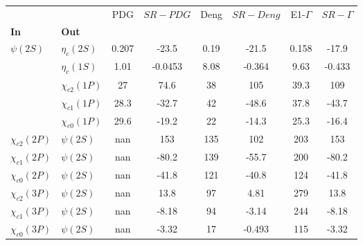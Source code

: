 \begin{tabular}{l|l|c|c|c|c|c|c}
\toprule
                &            &   PDG & $SR-PDG$ &  Deng & $SR-Deng$ &  E1-$\Gamma$ & $SR-\Gamma$ \\
\textbf{In} & \textbf{Out} &       &          &       &           &              &             \\
\midrule
\textbf{$\psi(2S)$} & \textbf{$\eta_{c}(2S)$} & 0.207 &    -23.5 &  0.19 &     -21.5 &        0.158 &       -17.9 \\
                & \textbf{$\eta_{c}(1S)$} &  1.01 &  -0.0453 &  8.08 &    -0.364 &         9.63 &      -0.433 \\
                & \textbf{$\chi_{c2}(1P)$} &    27 &     74.6 &    38 &       105 &         39.3 &         109 \\
                & \textbf{$\chi_{c1}(1P)$} &  28.3 &    -32.7 &    42 &     -48.6 &         37.8 &       -43.7 \\
                & \textbf{$\chi_{c0}(1P)$} &  29.6 &    -19.2 &    22 &     -14.3 &         25.3 &       -16.4 \\
\textbf{$\chi_{c2}(2P)$} & \textbf{$\psi(2S)$} &   nan &      153 &   135 &       102 &          203 &         153 \\
\textbf{$\chi_{c1}(2P)$} & \textbf{$\psi(2S)$} &   nan &    -80.2 &   139 &     -55.7 &          200 &       -80.2 \\
\textbf{$\chi_{c0}(2P)$} & \textbf{$\psi(2S)$} &   nan &    -41.8 &   121 &     -40.8 &          124 &       -41.8 \\
\textbf{$\chi_{c2}(3P)$} & \textbf{$\psi(2S)$} &   nan &     13.8 &    97 &      4.81 &          279 &        13.8 \\
\textbf{$\chi_{c1}(3P)$} & \textbf{$\psi(2S)$} &   nan &    -8.18 &    94 &     -3.14 &          244 &       -8.18 \\
\textbf{$\chi_{c0}(3P)$} & \textbf{$\psi(2S)$} &   nan &    -3.32 &    17 &    -0.493 &          115 &       -3.32 \\
\bottomrule
\end{tabular}
